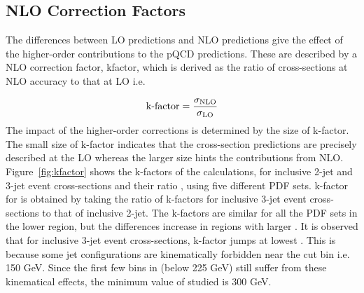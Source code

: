 \subsection{NLO Correction Factors}
\label{sec:nlo_factors}
The differences between LO predictions and NLO predictions give the effect of the higher-order contributions to the pQCD predictions. These are described by a NLO correction factor, k\hy factor, which is derived as the ratio of cross-sections at NLO accuracy to that at LO i.e.

\begin{equation}
\label{eq:kfactors}
 {\rm k\hy factor} = \frac{\sigma_{\rm NLO}}{\sigma_{\rm LO}}
\end{equation}
The impact of the higher-order corrections is determined by the size of k-factor. The small size of k-factor indicates that the cross-section predictions are precisely described at the LO whereas the larger size hints the contributions from NLO. Figure~\ref{fig:kfactor} shows the k-factors of the \NLOJETPP calculations, for inclusive 2-jet and 3-jet event cross-sections and their ratio \ratio, using five different PDF sets. k-factor for \ratio is obtained by taking the ratio of k-factors for inclusive 3-jet event cross-sections to that of inclusive 2-jet. The k-factors are similar for all the PDF sets in the lower region, but the differences increase in regions with larger \httwo. It is observed that for inclusive 3-jet event cross-sections, k-factor jumps at lowest \httwo. This is because some jet configurations are kinematically forbidden near the \pt cut bin i.e. 150 GeV. Since the first few bins in \httwo (below 225 GeV) still suffer from these kinematical effects, the minimum value of \httwo studied is 300 GeV.

